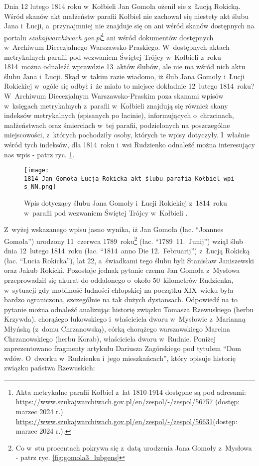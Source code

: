 Dnia 12 lutego 1814 roku w~Kołbieli Jan Gomoła ożenił sie z~Łucją Rokicką. 
Wśród skanów akt małżeństw parafii Kołbiel nie zachował się niestety akt 
ślubu Jana i~Łucji, a~przynajmniej nie znajduje się on ani wśród skanów 
dostępnych na portalu \emph{szukajwarchiwach.gov.pl}\footnote{Akta metrykalne 
parafii Kołbiel z~lat 1810-1914 dostępne są pod adresami: \\ 
\url{https://www.szukajwarchiwach.gov.pl/en/zespol/-/zespol/56757} (dostęp: 
marzec 2024 r.)\\ 
\url{https://www.szukajwarchiwach.gov.pl/en/zespol/-/zespol/56631}(dostęp: 
marzec 2024 r.).} ani wśród dokumentów dostępnych w~Archiwum 
Diecezjalnego Warszawsko-Praskiego. W~dostępnych aktach metrykalnych parafii 
pod wezwaniem Świętej Trójcy w~Kołbieli z~roku 1814~można odnaleźć wprawdzie 
13~aktów ślubów, ale nie ma wśród nich aktu ślubu Jana i~Łucji. Skąd w~takim 
razie wiadomo, iż ślub Jana Gomoły i~Łucji Rokickiej w~ogóle się odbył i~że 
miało to miejsce dokładnie 12~lutego 1814~roku? W~Archiwum Diecezjalnym 
Warszawsko-Praskim poza skanami wpisów w~księgach metrykalnych z~parafii 
w~Kołbieli znajdują się również skany indeksów metrykalnych (spisanych po 
łacinie), informujących o~chrzcinach, małżeństwach oraz śmierciach w~tej 
parafii, podzielonych na poszczególne miejscowości, z~których pochodziły 
osoby, których te wpisy dotyczyły. I~właśnie wśród tych indeksów, dla 
1814~roku i~wsi Rudzienko odnaleźć można interesujący nas wpis - patrz ryc. 
\ref{fig:jgomola_1814}.

\begin{figure}[!ht]
    \vspace*{0.5cm}
    \centering \texttt{[image: 
        1814\_Jan\_Gomoła\_Łucja\_Rokicka\_akt\_ślubu\_parafia\_Kołbiel\_wpis\_NN.png]}
    \captionsetup{format=hang}
    \caption{Wpis dotyczący ślubu Jana Gomoły i~Łucji Rokickiej z~1814~roku 
    w~parafii pod wezwaniem Świętej Trójcy w~Kołbieli \cite{par_kolbiel1}.}
    \label{fig:jgomola_1814}
\end{figure}

Z~wyżej wskazanego wpisu jasno wynika, iż Jan Gomoła (łac. \enquote{Joannes 
Gomoła}) urodzony 11~czerwca 1789~roku\footnote{Co w~stu procentach pokrywa 
się z~datą urodzenia Jana Gomoły z~Mysłowa - patrz ryc. 
\ref{fig:gomola3_lubgens}} (łac. \enquote{1789~11.~Junij}) wziął ślub dnia 
12~lutego 1814~roku (łac. \enquote{1814~anno Die 12.~Februarij}) z~Łucją 
Rokicką (łac. \enquote{Lucia Rokicka}), lat 22, a~świadkami tego ślubu byli 
Stanisław Janiszewski oraz Jakub Rokicki. Pozostaje jednak pytanie czemu Jan 
Gomoła z~Mysłowa przeprowadził się akurat do oddalonego o~około 50~kilometrów 
Rudzienka, w~sytuacji gdy mobilność ludności chłopskiej na początku XIX~wieku  
była bardzo ograniczona, szczególnie na tak dużych dystansach. Odpowiedź na 
to pytanie można odnaleźć analizując historię związku Tomasza Rzewuskiego 
(herbu Krzywda), chorążego łukowskiego i~właściciela dworu w~Mysłowie 
z~Marianną Młyńską (z~domu Chrzanowską), córką chorążego warszawskiego 
Marcina Chrzanowskiego (herbu Korab), właściciela dworu w~Rudnie. Poniżej 
zaprezentowano fragmenty artykułu Dariusza Zagórskiego pod tytułem 
\enquote{Dom wdów. O~dworku w~Rudzienku i~jego mieszkańcach}, który opisuje 
historię związku państwa Rzewuskich:

